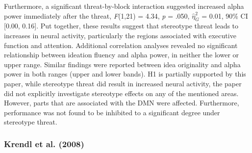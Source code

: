 \documentclass[
  stu,floatsintext]{apa7}
\begin{document}
Furthermore, a significant threat-by-block interaction suggested increased alpha power immediately after the threat, \emph{F}(1,21) = 4.34, \emph{p} = .050, \(\hat{\eta}^{2}_{G}\) = 0.01, 90\% CI {[}0.00, 0.16{]}.
Put together, these results suggest that stereotype threat leads to increases in neural activity, particularly the regions associated with executive function and attention.
Additional correlation analyses revealed no significant relationship between ideation fluency and alpha power, in neither the lower or upper range.
Similar findings were reported between idea originality and alpha power in both ranges (upper and lower bands).
H1 is partially supported by this paper, while stereotype threat did result in increased neural activity, the paper did not explicitly investigate stereotype effects on any of the mentioned areas. However, parts that are associated with the DMN were affected. Furthermore, performance was not found to be inhibited to a significant degree under stereotype threat.

\subsubsection{Krendl et al. (2008)}\label{krendlnegativeconsequencesthreat2008}
\end{document}
